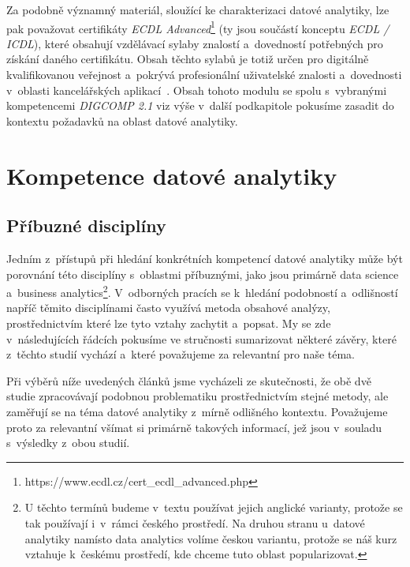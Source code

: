 Za podobně významný materiál, sloužící ke charakterizaci datové analytiky, lze pak považovat certifikáty \emph{ECDL Advanced}\footnote{https://www.ecdl.cz/cert\_ecdl\_advanced.php} (ty jsou součástí konceptu \emph{ECDL / ICDL}), které obsahují vzdělávací sylaby znalostí a~dovedností potřebných pro získání daného certifikátu. Obsah těchto sylabů je totiž určen pro digitálně kvalifikovanou veřejnost a~pokrývá profesionální uživatelské znalosti a~dovednosti v~oblasti kancelářských aplikací~\parencite{ecdl17}. Obsah tohoto modulu se spolu s~vybranými kompetencemi \emph{DIGCOMP 2.1} viz výše v~další podkapitole pokusíme zasadit do kontextu požadavků na oblast datové analytiky.

\hypertarget{kompetence-datovuxe9-analytiky}{%
\section{Kompetence datové analytiky}\label{kompetence-datovuxe9-analytiky}}

\hypertarget{pux159uxedbuznuxe9-discipluxedny}{%
\subsection{Příbuzné disciplíny}\label{pux159uxedbuznuxe9-discipluxedny}}

Jedním z~přístupů při hledání konkrétních kompetencí datové analytiky může být porovnání této disciplíny s~oblastmi příbuznými, jako jsou primárně data science a~business analytics\footnote{U těchto termínů budeme v~textu používat jejich anglické varianty, protože se tak používají i~v~rámci českého prostředí. Na druhou stranu u~datové analytiky namísto data analytics volíme českou variantu, protože se náš kurz vztahuje k~českému prostředí, kde chceme tuto oblast popularizovat.}. V~odborných pracích se k~hledání podobností a~odlišností napříč těmito disciplínami často využívá metoda obsahové analýzy, prostřednictvím které lze tyto vztahy zachytit a~popsat. My se zde v~následujících řádcích pokusíme ve stručnosti sumarizovat některé závěry, které z~těchto studií vychází a~které považujeme za relevantní pro naše téma.

Při výběrů níže uvedených článků jsme vycházeli ze skutečnosti, že obě dvě studie zpracovávají podobnou problematiku prostřednictvím stejné metody, ale zaměřují se na téma datové analytiky z~mírně odlišného kontextu. Považujeme proto za relevantní všímat si primárně takových informací, jež jsou v~souladu s~výsledky z~obou studií.

